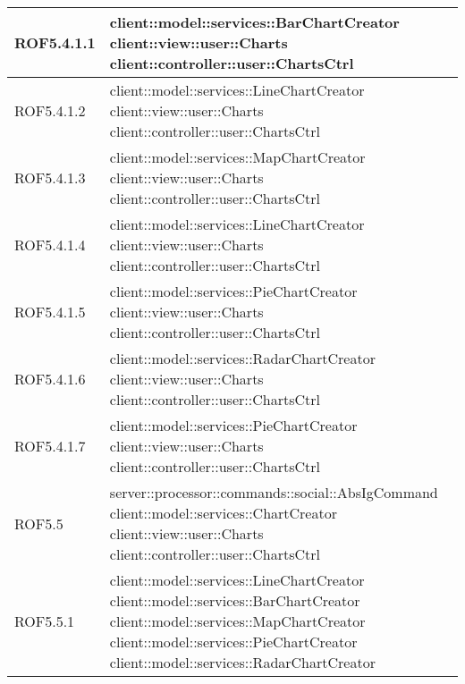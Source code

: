 \begin{center}
\begin{longtable}{| p{2.5cm} | p{11cm} |}
\hline
ROF5.4.1.1 & client::model::services::BarChartCreator \newline client::view::user::Charts \newline client::controller::user::ChartsCtrl \\
\hline
ROF5.4.1.2 & client::model::services::LineChartCreator \newline client::view::user::Charts \newline client::controller::user::ChartsCtrl \\
\hline
ROF5.4.1.3 & client::model::services::MapChartCreator \newline client::view::user::Charts \newline client::controller::user::ChartsCtrl \\
\hline
ROF5.4.1.4 & client::model::services::LineChartCreator \newline client::view::user::Charts \newline client::controller::user::ChartsCtrl \\
\hline
ROF5.4.1.5 & client::model::services::PieChartCreator \newline client::view::user::Charts \newline client::controller::user::ChartsCtrl \\
\hline
ROF5.4.1.6 & client::model::services::RadarChartCreator \newline client::view::user::Charts \newline client::controller::user::ChartsCtrl \\
\hline
ROF5.4.1.7 & client::model::services::PieChartCreator \newline client::view::user::Charts \newline client::controller::user::ChartsCtrl \\
\hline
ROF5.5 & server::processor::commands::social::AbsIgCommand \newline client::model::services::ChartCreator \newline client::view::user::Charts \newline client::controller::user::ChartsCtrl \\
\hline
ROF5.5.1 & client::model::services::LineChartCreator \newline client::model::services::BarChartCreator \newline client::model::services::MapChartCreator \newline client::model::services::PieChartCreator \newline client::model::services::RadarChartCreator \\

\end{longtable}
\end{center}
